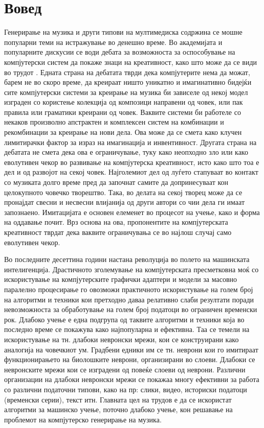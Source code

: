 \newpage
\chapter{Вовед}

Генерирање на музика и други типови на мултимедиска содржина се мошне популарни теми на истражување во денешно време. Во академијата и популарните дискусии се води дебата за возможноста за оспособување на компјутерски систем да покаже знаци на креативност, како што може да се види во трудот \cite{Ghedini2015}. Едната страна на дебатата тврди дека компјутерите нема да можат, барем не во скоро време, да креираат ништо уникатно и имагинативно бидејќи сите компјутерски системи за креирање на музика би зависеле од некој модел изграден со користење колекција од композици направени од човек, или пак правила или граматики креирани од човек. Ваквите системи би работеле со некаков произволно апстрактен и комплексен систем на комбинации и рекомбинации за креирање на нови дела. Ова може да се смета како клучен лимитирачки фактор за израз на имагинација и инвентивност. Другата страна на дебатата не смета дека ова е ограничување, туку како неопходно зло или како еволутивен чекор во развивање на компјутерска креативност, исто како што тоа е дел и од развојот на секој човек. Најголемиот дел од луѓето стапуваат во контакт со музиката долго време пред да започнат самите да допринесуваат кон целокупното човечко творештво. Така, во делата на секој творец може да се пронајдат свесни и несвесни влијанија од други автори со чии дела ги имаат запознаено. Имитацијата е основен елеменет во процесот на учење, како и форма на оддавање почит. Врз основа на ова, пропонентите на компјутерската креативност тврдат дека ваквите ограничувања се во најлош случај само еволутивен чекор.

Во последните десеттина години настана револуција во полето на машинската интелигенција. Драстичното зголемување на компјутерската пресметковна моќ со искористување на компјутерските графички адаптери и модели за масовно паралелно процесирање го овозможи практичното искористување на голем број на алгоритми и техники кои претходно даваа релативно слаби резултати поради невозможноста за обработување на голем број податоци во ограничен временски рок. Длабоко учење е една подгрупа од таквите алгоритми и техники која во последно време се покажува како најпопуларна и ефективна. Таа се темели на искористување на тн. длабоки невронски мрежи, кои се конструирани како аналогија на човечкиот ум. Градбени едники им се тн. неврони кои го имитираат функционирањето на биолошките неврони, организирани во слоеви. Длабоки се невронските мрежи кои се изградени од повеќе слоеви од неврони. Различни организации на длабоки невронски мрежи се покажаа многу ефективни за работа со различни податочни типови, како на пр: слики, видео, историски податоци (временски серии), текст итн. Главната цел на трудов е да се искористат алгоритми за машинско учење, поточно длабоко учење, кон решавање на проблемот на компјутерско генерирање на музика.

